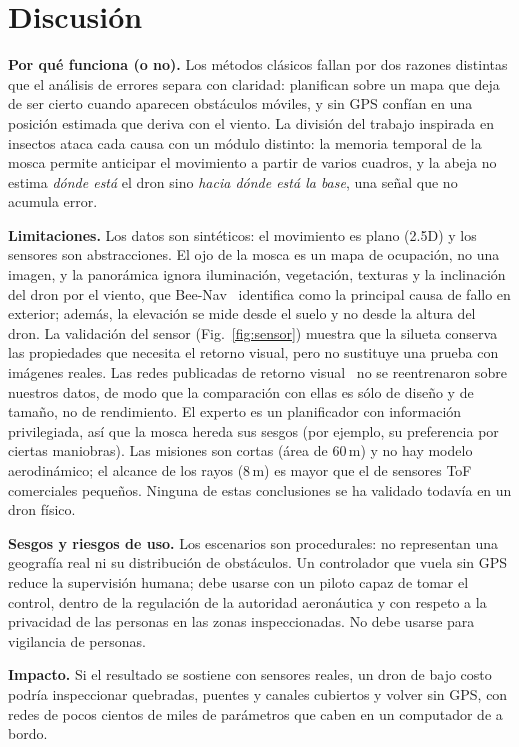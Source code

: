 \section{Discusión}\label{sec:discusion}
\textbf{Por qué funciona (o no).} Los métodos clásicos fallan por dos razones distintas que
el análisis de errores separa con claridad: planifican sobre un mapa que deja de ser cierto
cuando aparecen obstáculos móviles, y sin GPS confían en una posición estimada que deriva con
el viento. La división del trabajo inspirada en insectos ataca cada causa con un módulo
distinto: la memoria temporal de la mosca permite anticipar el movimiento a partir de varios
cuadros, y la abeja no estima \emph{dónde está} el dron sino \emph{hacia dónde está la base},
una señal que no acumula error. 

\textbf{Limitaciones.} Los datos son sintéticos: el movimiento es plano (2.5D) y los
sensores son abstracciones. El ojo de la mosca es un mapa de ocupación, no una imagen, y la
panorámica ignora iluminación, vegetación, texturas y la inclinación del dron por el viento,
que Bee-Nav~\cite{ou2026} identifica como la principal causa de fallo en exterior; además, la
elevación se mide desde el suelo y no desde la altura del dron. La validación del sensor
(Fig.~\ref{fig:sensor}) muestra que la silueta conserva las propiedades que necesita el
retorno visual, pero no sustituye una prueba con imágenes reales. Las redes publicadas de
retorno visual~\cite{firlefyn2024,ou2026} no se reentrenaron sobre nuestros datos, de modo que
la comparación con ellas es sólo de diseño y de tamaño, no de rendimiento. El experto es un
planificador con información privilegiada, así que la mosca hereda sus sesgos (por ejemplo,
su preferencia por ciertas maniobras). Las misiones son cortas (área de 60\,m) y no hay
modelo aerodinámico; el alcance de los rayos (8\,m) es mayor que el de sensores ToF
comerciales pequeños. Ninguna de estas conclusiones se ha validado todavía en un dron físico.

\textbf{Sesgos y riesgos de uso.} Los escenarios son procedurales: no representan una
geografía real ni su distribución de obstáculos. Un controlador que vuela sin GPS reduce la
supervisión humana; debe usarse con un piloto capaz de tomar el control, dentro de la
regulación de la autoridad aeronáutica y con respeto a la privacidad de las personas en las
zonas inspeccionadas. No debe usarse para vigilancia de personas.

\textbf{Impacto.} Si el resultado se sostiene con sensores reales, un dron de bajo costo
podría inspeccionar quebradas, puentes y canales cubiertos y volver sin GPS, con redes de
pocos cientos de miles de parámetros que caben en un computador de a bordo.
